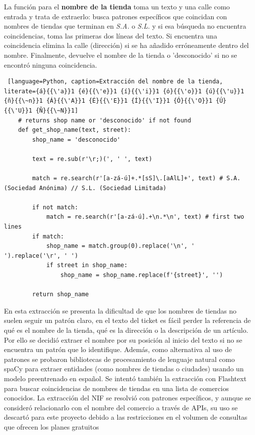 \begin{itemize}
\subitem La función para el \textbf{nombre de la tienda} toma un texto y una calle como entrada y trata de extraerlo: busca patrones específicos que coincidan con nombres de tiendas que terminan en \textit{S.A.} o \textit{S.L.} y si esa búsqueda no encuentra coincidencias, toma las primeras dos líneas del texto. Si encuentra una coincidencia elimina la calle (dirección) si se ha añadido erróneamente dentro del nombre. Finalmente, devuelve el nombre de la tienda o 'desconocido' si no se encontró ninguna coincidencia.
    \begin{lstlisting} [language=Python, caption=Extracción del nombre de la tienda, literate={á}{{\'a}}1 {é}{{\'e}}1 {í}{{\'i}}1 {ó}{{\'o}}1 {ú}{{\'u}}1 {ñ}{{\~n}}1 {Á}{{\'A}}1 {É}{{\'E}}1 {Í}{{\'I}}1 {Ó}{{\'O}}1 {Ú}{{\'U}}1 {Ñ}{{\~N}}1]
    # returns shop name or 'desconocido' if not found
    def get_shop_name(text, street):
        shop_name = 'desconocido'

        text = re.sub(r'\r;)(', ' ', text)

        match = re.search(r'[a-zá-ú]+.*[sS]\.[aAlL]+', text) # S.A. (Sociedad Anónima) // S.L. (Sociedad Limitada)

        if not match:
            match = re.search(r'[a-zá-ú].+\n.*\n', text) # first two lines
        if match:
            shop_name = match.group(0).replace('\n', ' ').replace('\r', ' ')
            if street in shop_name:
                shop_name = shop_name.replace(f'{street}', '')

        return shop_name
    \end{lstlisting}

En esta extracción se presenta la dificultad de que los nombres de tiendas no suelen seguir un patrón claro, en el texto del ticket es fácil perder la referencia de qué es el nombre de la tienda, qué es la dirección o la descripción de un artículo. Por ello se decidió extraer el nombre por su posición al inicio del texto si no se encuentra un patrón que lo identifique. Además, como alternativa al uso de patrones se probaron bibliotecas de procesamiento de lenguaje natural como spaCy para extraer entidades (como nombres de tiendas o ciudades) usando un modelo preentrenado en español. Se intentó también
la extracción con Flashtext para buscar coincidencias de nombres de tiendas en una lista de
comercios conocidos. La extracción del NIF se resolvió con patrones específicos,
y aunque se consideró relacionarlo con el nombre del comercio a través de APIs,
su uso se descartó para este proyecto debido a las restricciones en el volumen de
consultas que ofrecen los planes gratuitos


\end{itemize}
